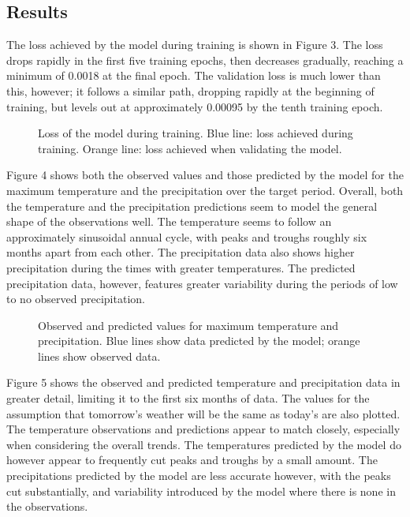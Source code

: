 \documentclass[12pt]{article}
\begin{document}
    
    \subsection{Results}

    The loss achieved by the model during training is shown in Figure 3. The loss drops rapidly in the first five training epochs, then 
    decreases gradually, reaching a minimum of 0.0018 at the final epoch. The validation loss is much lower than this, however; it follows 
    a similar path, dropping rapidly at the beginning of training, but levels out at approximately 0.00095 by the tenth training epoch.
    
    \begin{figure}
        \centering
        
        \caption{Loss of the model during training. Blue line: loss achieved during training. Orange line: loss achieved when validating the model.}
        \label{fig:weather_loss}
    \end{figure}

    Figure 4 shows both the observed values and those predicted by the model for the maximum temperature and the precipitation over the 
    target period. Overall, both the temperature and the precipitation predictions seem to model the general shape of the observations 
    well. The temperature seems to follow an approximately sinusoidal annual cycle, with peaks and troughs roughly six months apart from 
    each other. The precipitation data also shows higher precipitation during the times with greater temperatures. The predicted precipitation 
    data, however, features greater variability during the periods of low to no observed precipitation.
    
    \begin{figure}
        \centering
        
        \caption{Observed and predicted values for maximum temperature and precipitation. Blue lines show data predicted by the model; orange 
        lines show observed data.}
        \label{fig:weather_prediction}
    \end{figure}

    Figure 5 shows the observed and predicted temperature and precipitation data in greater detail, limiting it to the first six months of 
    data. The values for the assumption that tomorrow's weather will be the same as today's are also plotted. The temperature observations 
    and predictions appear to match closely, especially when considering the overall trends. The temperatures predicted by the model do however 
    appear to frequently cut peaks and troughs by a small amount. The precipitations predicted by the model are less accurate however, with 
    the peaks cut substantially, and variability introduced by the model where there is none in the observations.
\end{document}
